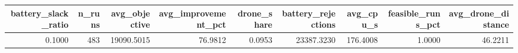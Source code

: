 \begin{tabular}{rrrrrrrrr}
\toprule
battery_slack_ratio & n_runs & avg_objective & avg_improvement_pct & drone_share & battery_rejections & avg_cpu_s & feasible_runs_pct & avg_drone_distance \\
\midrule
0.1000 & 483 & 19090.5015 & 76.9812 & 0.0953 & 23387.3230 & 176.4008 & 1.0000 & 46.2211 \\
\bottomrule
\end{tabular}
